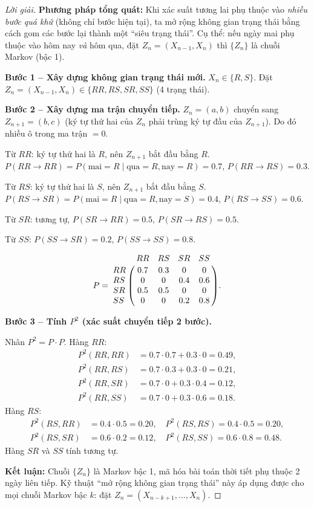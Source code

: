 \documentclass[8pt,a4paper]{article}
\newenvironment{solution}{\begin{proof}[Lời giải]}{\end{proof}}
\begin{document}
\begin{solution}
\textbf{Phương pháp tổng quát:} Khi xác suất tương lai phụ thuộc vào \emph{nhiều bước quá khứ} (không chỉ bước hiện tại), ta mở rộng không gian trạng thái bằng cách gom các bước lại thành một ``siêu trạng thái''. Cụ thể: nếu ngày mai phụ thuộc vào hôm nay \emph{và} hôm qua, đặt $Z_n = (X_{n-1}, X_n)$ thì $\{Z_n\}$ là chuỗi Markov (bậc 1).

\textbf{Bước 1 -- Xây dựng không gian trạng thái mới.}
$X_n \in \{R, S\}$. Đặt $Z_n = (X_{n-1}, X_n) \in \{RR, RS, SR, SS\}$ (4 trạng thái).

\textbf{Bước 2 -- Xây dựng ma trận chuyển tiếp.}
$Z_n = (a, b)$ chuyển sang $Z_{n+1} = (b, c)$ (ký tự thứ hai của $Z_n$ phải trùng ký tự đầu của $Z_{n+1}$). Do đó nhiều ô trong ma trận $= 0$.

Từ $RR$: ký tự thứ hai là $R$, nên $Z_{n+1}$ bắt đầu bằng $R$. $P(RR \to RR) = P(\text{mai}=R \mid \text{qua}=R, \text{nay}=R) = 0.7$, $P(RR \to RS) = 0.3$.

Từ $RS$: ký tự thứ hai là $S$, nên $Z_{n+1}$ bắt đầu bằng $S$. $P(RS \to SR) = P(\text{mai}=R \mid \text{qua}=R, \text{nay}=S) = 0.4$, $P(RS \to SS) = 0.6$.

Từ $SR$: tương tự, $P(SR \to RR) = 0.5$, $P(SR \to RS) = 0.5$.

Từ $SS$: $P(SS \to SR) = 0.2$, $P(SS \to SS) = 0.8$.

\[
  P = \bordermatrix{
    & RR & RS & SR & SS \cr
    RR & 0.7 & 0.3 & 0 & 0 \cr
    RS & 0 & 0 & 0.4 & 0.6 \cr
    SR & 0.5 & 0.5 & 0 & 0 \cr
    SS & 0 & 0 & 0.2 & 0.8
  }.
\]

\textbf{Bước 3 -- Tính $P^2$ (xác suất chuyển tiếp 2 bước).}

Nhân $P^2 = P \cdot P$. Hàng $RR$:
\begin{align*}
  P^2(RR, RR) &= 0.7 \cdot 0.7 + 0.3 \cdot 0 = 0.49, \\
  P^2(RR, RS) &= 0.7 \cdot 0.3 + 0.3 \cdot 0 = 0.21, \\
  P^2(RR, SR) &= 0.7 \cdot 0 + 0.3 \cdot 0.4 = 0.12, \\
  P^2(RR, SS) &= 0.7 \cdot 0 + 0.3 \cdot 0.6 = 0.18.
\end{align*}
Hàng $RS$:
\begin{align*}
  P^2(RS, RR) &= 0.4 \cdot 0.5 = 0.20, \quad P^2(RS, RS) = 0.4 \cdot 0.5 = 0.20, \\
  P^2(RS, SR) &= 0.6 \cdot 0.2 = 0.12, \quad P^2(RS, SS) = 0.6 \cdot 0.8 = 0.48.
\end{align*}
Hàng $SR$ và $SS$ tính tương tự.

\textbf{Kết luận:} Chuỗi $\{Z_n\}$ là Markov bậc 1, mã hóa bài toán thời tiết phụ thuộc 2 ngày liên tiếp. Kỹ thuật ``mở rộng không gian trạng thái'' này áp dụng được cho mọi chuỗi Markov bậc $k$: đặt $Z_n = (X_{n-k+1}, \ldots, X_n)$.
\end{solution}
\end{document}
